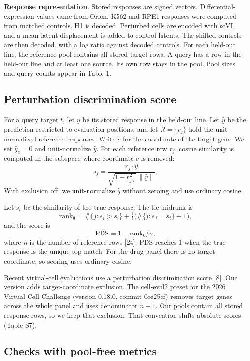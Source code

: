 \documentclass[12pt]{article}
\begin{document}
\textbf{Response representation.} Stored responses are signed vectors. Differential-expression values came from Orion. K562 and RPE1 responses were computed from matched controls. H1 is decoded. Perturbed cells are encoded with scVI, and a mean latent displacement is added to control latents. The shifted controls are then decoded, with a log ratio against decoded controls. For each held-out line, the reference pool contains all stored target rows. A query has a row in the held-out line and at least one source. Its own row stays in the pool. Pool sizes and query counts appear in Table 1.

\subsection*{Perturbation discrimination score}

For a query target $t$, let $y$ be its stored response in the held-out line. Let $\hat{y}$ be the prediction restricted to evaluation positions, and let $R = \{r_j\}$ hold the unit-normalized reference responses. Write $c$ for the coordinate of the target gene. We set $\hat{y}_c = 0$ and unit-normalize $\hat{y}$. For each reference row $r_j$, cosine similarity is computed in the subspace where coordinate $c$ is removed:
\[
s_j = \frac{r_j \cdot \hat{y}}{\sqrt{1 - r_{j,c}^{2}}\,\lVert \hat{y} \rVert},
\]
With exclusion off, we unit-normalize $\hat{y}$ without zeroing and use ordinary cosine.

Let $s_t$ be the similarity of the true response. The tie-midrank is
\[
\mathrm{rank}_0 = \#\{j : s_j > s_t\} + \tfrac{1}{2}\bigl(\#\{j : s_j = s_t\} - 1\bigr),
\]
and the score is
\[
\mathrm{PDS} = 1 - \mathrm{rank}_0 / n,
\]
where $n$ is the number of reference rows [24]. PDS reaches 1 when the true response is the unique top match. For the drug panel there is no target coordinate, so scoring uses ordinary cosine.

Recent virtual-cell evaluations use a perturbation discrimination score [8]. Our version adds target-coordinate exclusion. The cell-eval2 preset for the 2026 Virtual Cell Challenge (version 0.18.0, commit 0ce25cf) removes target genes across the whole panel and uses denominator $n-1$. Our pools contain all stored response rows, so we keep that exclusion. That convention shifts absolute scores (Table S7).

\subsection*{Checks with pool-free metrics}
\end{document}
